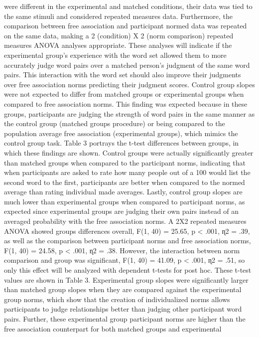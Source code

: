 \documentclass[english,man]{apa6}
\theoremstyle{definition}
\theoremstyle{definition}
\theoremstyle{definition}
\theoremstyle{remark}
\begin{document}
were different in the experimental and matched conditions, their data
was tied to the same stimuli and considered repeated measures data.
Furthermore, the comparison between free association and participant
normed data was repeated on the same data, making a 2 (condition) X 2
(norm comparison) repeated measures ANOVA analyses appropriate. These
analyses will indicate if the experimental group's experience with the
word set allowed them to more accurately judge word pairs over a matched
person's judgment of the same word pairs. This interaction with the word
set should also improve their judgments over free association norms
predicting their judgment scores. Control group slopes were not expected
to differ from matched groups or experimental groups when compared to
free association norms. This finding was expected because in these
groups, participants are judging the strength of word pairs in the same
manner as the control group (matched groups procedure) or being compared
to the population average free association (experimental groups), which
mimics the control group task. Table 3 portrays the t-test differences
between groups, in which these findings are shown. Control groups were
actually significantly greater than matched groups when compared to the
participant norms, indicating that when participants are asked to rate
how many people out of a 100 would list the second word to the first,
participants are better when compared to the normed average than rating
individual made averages. Lastly, control group slopes are much lower
than experimental groups when compared to participant norms, as expected
since experimental groups are judging their own pairs instead of an
averaged probability with the free association norms. A 2X2 repeated
measures ANOVA showed groups differences overall, F(1, 40) = 25.65, p
\textless{} .001, ɳ2 = .39, as well as the comparison between
participant norms and free association norms, F(1, 40) = 24.58, p
\textless{} .001, ɳ2 = .38. However, the interaction between norm
comparison and group was significant, F(1, 40) = 41.09, p \textless{}
.001, ɳ2 = .51, so only this effect will be analyzed with dependent
t-tests for post hoc. These t-test values are shown in Table 3.
Experimental group slopes were significantly larger than matched group
slopes when they are compared against the experimental group norms,
which show that the creation of individualized norms allows participants
to judge relationships better than judging other participant word pairs.
Further, these experimental group participant norms are higher than the
free association counterpart for both matched groups and experimental
\end{document}
